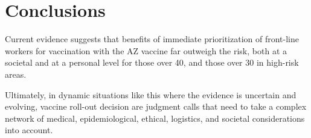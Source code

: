 \documentclass[]{interact}
\theoremstyle{plain}%
\theoremstyle{definition}
\theoremstyle{remark}
\begin{document}
\hypertarget{conclusions}{%
\section{Conclusions}\label{conclusions}}

Current evidence suggests that benefits of immediate prioritization of
front-line workers for vaccination with the AZ vaccine far outweigh the
risk, both at a societal and at a personal level for those over 40, and
those over 30 in high-risk areas.

Ultimately, in dynamic situations like this where the evidence is
uncertain and evolving, vaccine roll-out decision are judgment calls
that need to take a complex network of medical, epidemiological,
ethical, logistics, and societal considerations into account.



\end{document}
